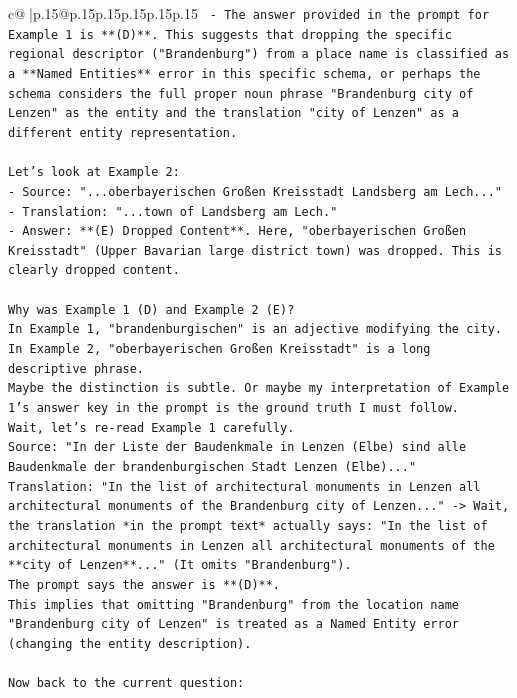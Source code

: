 \documentclass{article}
\begin{document}
{\begin{supertabular}{c@{$\;$}|p{.15\linewidth}@{}p{.15\linewidth}p{.15\linewidth}p{.15\linewidth}p{.15\linewidth}p{.15\linewidth}}
{{{\texttt{   {-} The answer provided in the prompt for Example 1 is **(D)**. This suggests that dropping the specific regional descriptor ("Brandenburg") from a place name is classified as a **Named Entities** error in this specific schema, or perhaps the schema considers the full proper noun phrase "Brandenburg city of Lenzen" as the entity and the translation "city of Lenzen" as a different entity representation.} \\
\\ 
\texttt{Let's look at Example 2:} \\
\texttt{{-} Source: "...oberbayerischen Großen Kreisstadt Landsberg am Lech..."} \\
\texttt{{-} Translation: "...town of Landsberg am Lech."} \\
\texttt{{-} Answer: **(E) Dropped Content**. Here, "oberbayerischen Großen Kreisstadt" (Upper Bavarian large district town) was dropped. This is clearly dropped content.} \\
\\ 
\texttt{Why was Example 1 (D) and Example 2 (E)?} \\
\texttt{In Example 1, "brandenburgischen" is an adjective modifying the city. In Example 2, "oberbayerischen Großen Kreisstadt" is a long descriptive phrase.} \\
\texttt{Maybe the distinction is subtle. Or maybe my interpretation of Example 1's answer key in the prompt is the ground truth I must follow.} \\
\texttt{Wait, let's re{-}read Example 1 carefully.} \\
\texttt{Source: "In der Liste der Baudenkmale in Lenzen (Elbe) sind alle Baudenkmale der brandenburgischen Stadt Lenzen (Elbe)..."} \\
\texttt{Translation: "In the list of architectural monuments in Lenzen all architectural monuments of the Brandenburg city of Lenzen..." {-}> Wait, the translation *in the prompt text* actually says: "In the list of architectural monuments in Lenzen all architectural monuments of the **city of Lenzen**..." (It omits "Brandenburg").} \\
\texttt{The prompt says the answer is **(D)**.} \\
\texttt{This implies that omitting "Brandenburg" from the location name "Brandenburg city of Lenzen" is treated as a Named Entity error (changing the entity description).} \\
\\ 
\texttt{Now back to the current question:} \\
}}}
\end{supertabular}}
\end{document}
